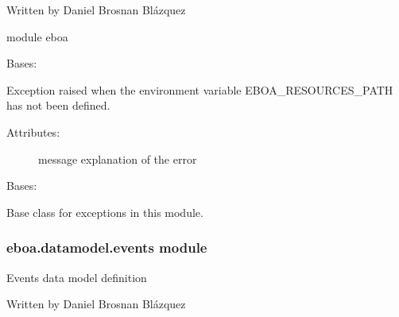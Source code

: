 Written by Daniel Brosnan Blázquez

module eboa

\begin{fulllineitems}
\label{\detokenize{eboa.datamodel:eboa.datamodel.errors.EboaResourcesPathNotAvailable}}
Bases: {\hyperref[\detokenize{eboa.datamodel:eboa.datamodel.errors.Error}]{}}

Exception raised when the environment variable EBOA\_RESOURCES\_PATH has not been defined.
\begin{description}
\item[{Attributes:}] \leavevmode
message \textendash{} explanation of the error

\end{description}

\end{fulllineitems}


\begin{fulllineitems}
\label{\detokenize{eboa.datamodel:eboa.datamodel.errors.Error}}
Bases: 

Base class for exceptions in this module.

\end{fulllineitems}



\subsubsection{eboa.datamodel.events module}
\label{\detokenize{eboa.datamodel:module-eboa.datamodel.events}}\label{\detokenize{eboa.datamodel:eboa-datamodel-events-module}}
Events data model definition

Written by Daniel Brosnan Blázquez


